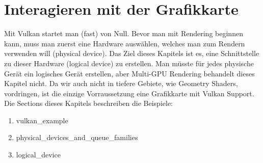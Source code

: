 \documentclass[11pt,a4paper]{report}
\begin{document}
\chapter{Interagieren mit der Grafikkarte}
Mit Vulkan startet man (fast) von Null. Bevor man mit Rendering beginnen kann, muss man zuerst eine Hardware auswählen, welches man zum Rendern verwenden will (physical device). Das Ziel dieses Kapitels ist es, eine Schnittstelle zu dieser Hardware (logical device) zu erstellen. Man müsste für jedes physische Gerät ein logisches Gerät erstellen, aber Multi-GPU Rendering behandelt dieses Kapitel nicht. Da wir auch nicht in tiefere Gebiete, wie Geometry Shaders, vordringen, ist die einzige Vorraussetzung eine Grafikkarte mit Vulkan Support.\\
Die Sections dieses Kapitels beschreiben die Beispiele:
\begin{enumerate}
	\item vulkan\_example
	\item physical\_devices\_and\_queue\_families
	\item logical\_device
\end{enumerate}
\end{document}
